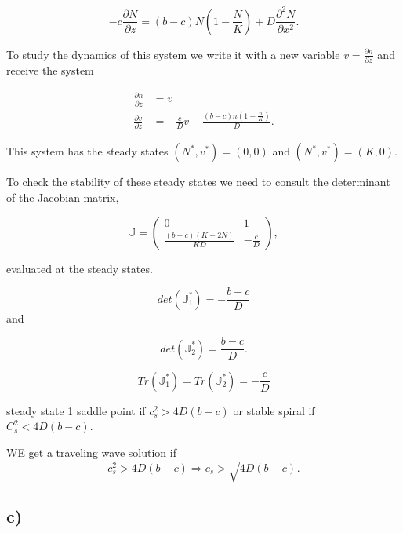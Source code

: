 \begin{equation}
-c\frac{\partial N}{\partial z}=(b-c)N\left(1-\frac{N}{K}\right)+D\frac{\partial^2 N}{\partial x^2}.
\end{equation}

To study the dynamics of this system we write it with a new variable $v=\frac{\partial n}{\partial z}$ and receive the system 

\begin{align*}
\frac{\partial n}{\partial z}&=v\\
\frac{\partial v}{\partial z}&=-\frac{c}{D}v-\frac{(b-c)n(1-\frac{n}{K})}{D}.
\end{align*}

This system has the steady states $(N^*,v^*)=(0,0)$ and $(N^*,v^*)=(K,0)$.

To check the stability of these steady states we need to consult the determinant of the Jacobian matrix,

\begin{equation}
\mathbb{J}=\left(\begin{array}{cc}
0 & 1 \\
  \frac{(b-c)(K-2N)}{KD} & -\frac{c}{D}
\end{array}\right),
\end{equation}

 evaluated at the steady states.
 
 $$
 det(\mathbb{J}^*_1)= -\frac{b-c}{D}
 $$
 and
 
 $$
 det(\mathbb{J}^*_2)=\frac{b-c}{D}.
 $$
 
 $$
 Tr(\mathbb{J}^*_1)=Tr(\mathbb{J}^*_2)=-\frac{c}{D}
 $$
 
 steady state 1 saddle point if $c^2_s>4D(b-c)$ or stable spiral if $C^2_s<4D(b-c)$.
 
 WE get a traveling wave solution if 
 $$
 c^2_s>4D(b-c)\Rightarrow c_s > \sqrt{4D(b-c)}.
 $$
 
\subsection{c)}

